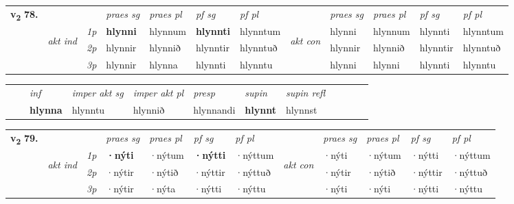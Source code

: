 \begin{tabular}{llllllllllll} \toprule
\multirow{4}{*}{{{\textbf{v{\textsubscript{2}}} \Large{\textbf{78.}}}}}  & &   &  \textit{praes sg}  & \textit{praes pl}  &\textit{ pf sg} & \textit{pf pl} &  &  \textit{praes sg}  & \textit{praes pl}  & \textit{pf sg} & \textit{pf pl } \\*
	\cmidrule{4-7} \cmidrule{9-12}
 & \multirow{3}{*}{\begin{turn}{90}\textit{akt ind}\end{turn}} & {\textit{1p}} & \textbf{hlynni} & hlynnum    & \textbf{hlynnti} & hlynntum & \multirow{3}{*}{\begin{turn}{90}\textit{akt con}\end{turn}} &hlynni & hlynnum & hlynnti & hlynntum\\*
& &  {\textit{2p}} &  hlynnir  & hlynnið   & hlynntir & hlynntuð & & hlynnir & hlynnið & hlynntir & hlynntuð \\*
& &  {\textit{3p}} & hlynnir & hlynna   & hlynnti & hlynntu & & hlynni & hlynni& hlynnti & hlynntu  \\*
\cmidrule{4-7} \cmidrule{9-12}
\end{tabular}


\begin{tabular}{llllllllllll}
 & & \textit{inf} & \textit{imper akt sg} & \textit{imper akt pl}   & \textit{presp} & \textit{supin} & \textit{supin refl}      \\*
  & & \textbf{hlynna} & hlynntu  & hlynnið   & hlynnandi &  \textbf{hlynnt} & hlynnst  \\*
\cmidrule{1-12}
\end{tabular}



\begin{tabular}{llllllllllll} \toprule
\multirow{4}{*}{{{\textbf{v{\textsubscript{2}}} \Large{\textbf{79.}}}}}  & &   &  \textit{praes sg}  & \textit{praes pl}  &\textit{ pf sg} & \textit{pf pl} &  &  \textit{praes sg}  & \textit{praes pl}  & \textit{pf sg} & \textit{pf pl } \\*
	\cmidrule{4-7} \cmidrule{9-12}
 & \multirow{3}{*}{\begin{turn}{90}\textit{akt ind}\end{turn}} & {\textit{1p}} & \textbf{·nýti} & ·nýtum    & \textbf{·nýtti} & ·nýttum & \multirow{3}{*}{\begin{turn}{90}\textit{akt con}\end{turn}} &·nýti & ·nýtum & ·nýtti & ·nýttum\\*
& &  {\textit{2p}} &  ·nýtir  & ·nýtið   & ·nýttir & ·nýttuð & & ·nýtir & ·nýtið & ·nýttir & ·nýttuð \\*
& &  {\textit{3p}} & ·nýtir & ·nýta   & ·nýtti & ·nýttu & & ·nýti & ·nýti& ·nýtti & ·nýttu  \\*
\cmidrule{4-7} \cmidrule{9-12}
\end{tabular}


